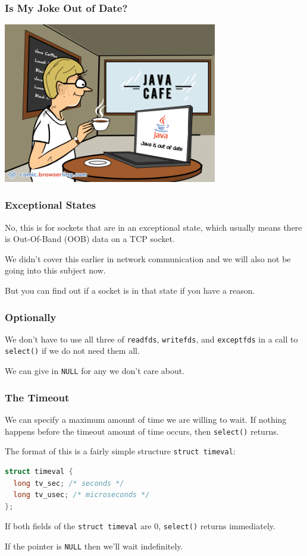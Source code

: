 \begin{frame}
\frametitle{Is My Joke Out of Date?}

\begin{center}
	\includegraphics[width=0.7\textwidth]{images/java-joke.png}
\end{center}

\end{frame}

\begin{frame}
\frametitle{Exceptional States}

No, this is for sockets that are in an exceptional state, which usually means there is Out-Of-Band (OOB) data on a TCP socket. 

We didn't cover this earlier in network communication and we will also not be going into this subject now. 

But you can find out if a socket is in that state if you have a reason.

\end{frame}


\begin{frame}
\frametitle{Optionally}

We don't have to use all three of \texttt{readfds}, \texttt{writefds}, and \texttt{exceptfds} in a call to \texttt{select()} if we do not need them all. 

We can give in \texttt{NULL} for any we don't care about.

\end{frame}


\begin{frame}[fragile]
\frametitle{The Timeout}

We can specify a maximum amount of time we  are willing to wait. If nothing happens before the timeout amount of time occurs, then \texttt{select()} returns. 

The format of this is a fairly simple structure \texttt{struct timeval}: 

\begin{lstlisting}[language=C]
struct timeval {
  long tv_sec; /* seconds */
  long tv_usec; /* microseconds */
};
\end{lstlisting}

If both fields of the \texttt{struct timeval} are 0, \texttt{select()} returns immediately.

If the pointer is \texttt{NULL} then we'll wait indefinitely.
\end{frame}


